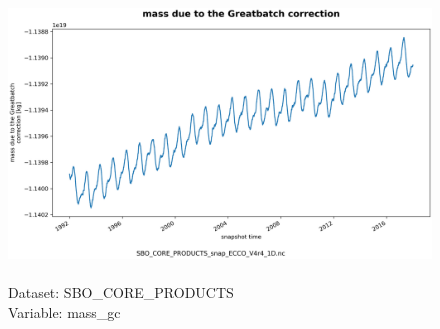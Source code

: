 \begin{figure}[H]
\centering
\includegraphics[scale=0.5]{../images/plots/oneD_plots/SBO_Core_Products/mass_gc.png}
\caption{\\Dataset: SBO\_CORE\_PRODUCTS\\Variable: mass\_gc}
\label{tab:table-SBO_CORE_PRODUCTS_mass_gc-Plot}
\end{figure}
\pagebreak
